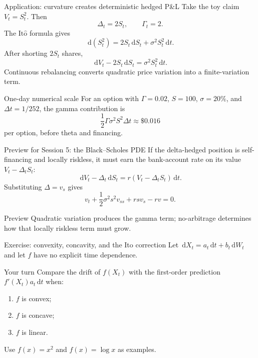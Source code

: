 \documentclass[handout,10pt,aspectratio=169]{beamer}
\newcommand{\dd}{\,\mathrm d}
\newcommand{\Ito}{\mathrm{It\hat{o}}}
\begin{document}
\begin{frame}{Application: curvature creates deterministic hedged P\&L}
\small
Take the toy claim \(V_t=S_t^2\). Then
\[
\Delta_t=2S_t,
\qquad
\Gamma_t=2.
\]
The \(\Ito\) formula gives
\[
\dd(S_t^2)=2S_t\dd S_t+\sigma^2S_t^2\dd t.
\]
After shorting \(2S_t\) shares,
\[
\boxed{\dd V_t-2S_t\dd S_t=\sigma^2S_t^2\dd t.}
\]
Continuous rebalancing converts quadratic price variation into a finite-variation term.
\begin{block}{One-day numerical scale}
For an option with \(\Gamma=0.02\), \(S=100\), \(\sigma=20\%\), and \(\Delta t=1/252\), the gamma contribution is
\[
\frac12\Gamma\sigma^2S^2\Delta t\approx\$0.016
\]
per option, before theta and financing.
\end{block}
\end{frame}

\begin{frame}{Preview for Session 5: the Black--Scholes PDE}
If the delta-hedged position is self-financing and locally riskless, it must earn the bank-account rate on its value \(V_t-\Delta_tS_t\):
\[
\dd V_t-\Delta_t\dd S_t
=r(V_t-\Delta_tS_t)\dd t.
\]
Substituting \(\Delta=v_s\) gives
\[
\boxed{
v_t+\frac12\sigma^2s^2v_{ss}+rsv_s-rv=0.}
\]
\begin{block}{Preview}
Quadratic variation produces the gamma term; no-arbitrage determines how that locally riskless term must grow.
\end{block}
\end{frame}

\begin{frame}{Exercise: convexity, concavity, and the Ito correction}
Let \(\dd X_t=a_t\dd t+b_t\dd W_t\) and let \(f\) have no explicit time dependence.
\begin{block}{Your turn}
Compare the drift of \(f(X_t)\) with the first-order prediction \(f'(X_t)a_t\dd t\) when:
\begin{enumerate}
\item \(f\) is convex;
\item \(f\) is concave;
\item \(f\) is linear.
\end{enumerate}
Use \(f(x)=x^2\) and \(f(x)=\log x\) as examples.
\end{block}
\end{frame}
\end{document}
